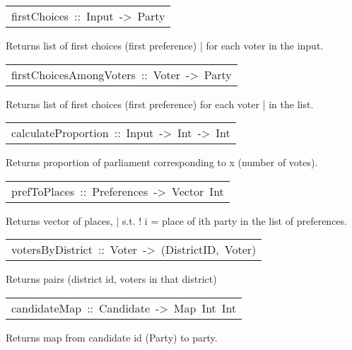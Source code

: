 \begin{haddockdesc}
\item[\begin{tabular}{@{}l}
firstChoices\ ::\ Input\ ->\ {\char 91}Party{\char 93}
\end{tabular}]\haddockbegindoc
Returns list of first choices (first preference)
 | for each voter in the input.\par

\end{haddockdesc}
\begin{haddockdesc}
\item[\begin{tabular}{@{}l}
firstChoicesAmongVoters\ ::\ {\char 91}Voter{\char 93}\ ->\ {\char 91}Party{\char 93}
\end{tabular}]\haddockbegindoc
Returns list of first choices (first preference) for each voter
 | in the list.\par

\end{haddockdesc}
\begin{haddockdesc}
\item[\begin{tabular}{@{}l}
calculateProportion\ ::\ Input\ ->\ Int\ ->\ Int
\end{tabular}]\haddockbegindoc
Returns proportion of parliament corresponding to x (number of votes).\par

\end{haddockdesc}
\begin{haddockdesc}
\item[\begin{tabular}{@{}l}
prefToPlaces\ ::\ Preferences\ ->\ Vector\ Int
\end{tabular}]\haddockbegindoc
Returns vector of places,
 | s.t. ! i = place of ith party in the list of preferences.\par

\end{haddockdesc}
\begin{haddockdesc}
\item[\begin{tabular}{@{}l}
votersByDistrict\ ::\ {\char 91}Voter{\char 93}\ ->\ {\char 91}(DistrictID,\ {\char 91}Voter{\char 93}){\char 93}
\end{tabular}]\haddockbegindoc
Returns pairs (district id, voters in that district)\par

\end{haddockdesc}
\begin{haddockdesc}
\item[\begin{tabular}{@{}l}
candidateMap\ ::\ {\char 91}Candidate{\char 93}\ ->\ Map\ Int\ Int
\end{tabular}]\haddockbegindoc
Returns map from candidate id (Party) to party.\par

\end{haddockdesc}